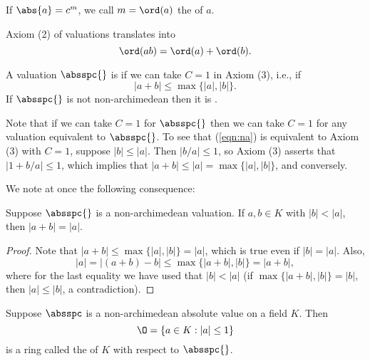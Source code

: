 \begin{definition}[Order]
If $\abs{a} = c^m$, we call $m=\ord(a)$ the  
of $a$. 
\end{definition}
Axiom (2) of valuations
translates into
$$
  \ord(ab) = \ord(a) + \ord(b).
$$

\begin{definition}
A valuation $\absspc{}$ is  
if we can take $C=1$ in Axiom (3), i.e., if
\begin{equation}\label{eqn:na}
   |a + b| \leq \max\bigl\{|a|,|b|\bigr\}.
\end{equation}
If $\absspc{}$ is not non-archimedean then
it is .
\end{definition}
Note that if we can take $C=1$ for $\absspc{}$
then we can take $C=1$ for any valuation equivalent to
$\absspc{}$.
To see that (\ref{eqn:na}) is equivalent to Axiom (3) with
$C=1$, suppose $|b|\leq |a|$.  Then $|b/a|\leq 1$, so 
Axiom (3) asserts that $|1+b/a|\leq 1$, which implies
that $|a+b| \leq |a| = \max\{|a|,|b|\}$, and conversely.

We note at once the following consequence:
\begin{lemma}
Suppose $\absspc{}$ is a non-archimedean valuation.
If $a,b\in K$ with $|b|<|a|$, then
$
 |a+b|=|a|.
$
\end{lemma}
\begin{proof}
Note that $|a+b|\leq \max\{|a|,|b|\} = |a|$, which
is true even if $|b|=|a|$.  Also,
$$
  |a| = |(a+b) - b| \leq \max\{|a+b|, |b|\} = |a+b|,
$$
where for the last equality we have used that $|b|<|a|$
(if $\max\{|a+b|,|b|\} = |b|$, then $|a|\leq |b|$,
a contradiction).

\end{proof}

\begin{definition}
Suppose $\absspc$ is a non-archimedean absolute
value on a  field $K$.  Then
$$
  \O = \{a\in K : |a|\leq 1\}
$$ is a ring called the  of $K$
with respect to $\absspc{}$.
\end{definition}

